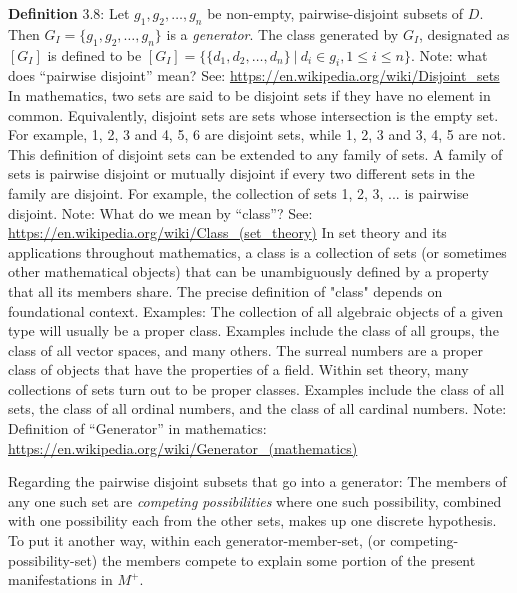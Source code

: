 \documentclass{article}
\begin{document}
\par 
\textbf{Definition} 3.8: Let $g_1, g_2, \ldots, g_n$ be non-empty,
pairwise-disjoint subsets of $D$. Then $G_I = \{ g_1, g_2, \ldots, g_n\}$ is a
\textit{generator}.  The class generated by $G_I$, designated as $[G_I]$ is
defined to be $[G_I] = \{ \{d_1, d_2, \ldots, d_n  \} \:|\: d_i \in g_i, 1 \leq
i \leq n \}$.
\newline
Note: what does ``pairwise disjoint'' mean?  See: \url{https://en.wikipedia.org/wiki/Disjoint_sets}
\newline
In mathematics, two sets are said to be disjoint sets if they have no element in common. Equivalently,
disjoint sets are sets whose intersection is the empty set.
For example, {1, 2, 3} and {4, 5, 6} are disjoint sets, while {1, 2, 3} and {3, 4, 5} are not.
\newline
This definition of disjoint sets can be extended to any family of sets. A family of sets is pairwise disjoint
or mutually disjoint if every two different sets in the family are disjoint.
For example, the collection of sets { {1}, {2}, {3}, ... } is pairwise disjoint.
\newline
Note: What do we mean by ``class''? See: \url{https://en.wikipedia.org/wiki/Class_(set_theory)}
\newline
In set theory and its applications throughout mathematics, a class is a collection of sets (or sometimes
other mathematical objects) that can be unambiguously defined by a property that all its members share.
The precise definition of "class" depends on foundational context.
\newline
Examples:\newline
The collection of all algebraic objects of a given type will usually be a proper class. Examples
include the class of all groups, the class of all vector spaces, and many others.
\newline
The surreal numbers are a proper class of objects that have the properties of a field.
\newline
Within set theory, many collections of sets turn out to be proper classes. Examples include the
class of all sets, the class of all ordinal numbers, and the class of all cardinal numbers.
\newline
Note: Definition of ``Generator'' in mathematics:
\newline
\url{https://en.wikipedia.org/wiki/Generator_(mathematics)}
\newline
\par
Regarding the pairwise disjoint subsets that go into a generator:  The members
of any one such set are \textit{competing possibilities} where one such
possibility, combined with one possibility each from the other sets, makes up
one discrete hypothesis.  To put it another way, within each
generator-member-set, (or competing-possibility-set) the members compete to
explain some portion of the present manifestations in $M^{+}$.
\newline
\end{document}
